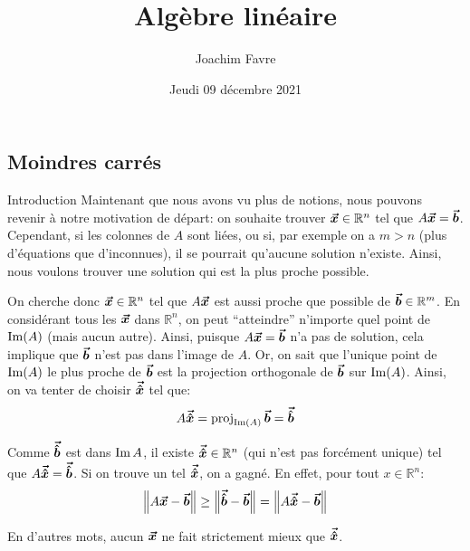 \documentclass[a4paper]{article}
\title{Algèbre linéaire}
\author{Joachim Favre}
\date{Jeudi 09 décembre 2021}
\begin{document}
\maketitle


\subsection{Moindres carrés}
\begin{parag}{Introduction}
    Maintenant que nous avons vu plus de notions, nous pouvons revenir à notre motivation de départ: on souhaite trouver $\bm{\protect\vec{x}} \in \mathbb{R}^n$ tel que $A \bm{\protect\vec{x}} = \bm{\protect\vec{b}}$. Cependant, si les colonnes de $A$ sont liées, ou si, par exemple on a $m > n$ (plus d'équations que d'inconnues), il se pourrait qu'aucune solution n'existe. Ainsi, nous voulons trouver une solution qui est la plus proche possible.

    On cherche donc $\bm{\protect\vec{x}} \in \mathbb{R}^n$ tel que $A \bm{\protect\vec{x}}$ est aussi proche que possible de $\bm{\protect\vec{b}} \in \mathbb{R}^m$. En considérant tous les $\bm{\protect\vec{x}}$ dans $\mathbb{R}^n$, on peut ``atteindre'' n'importe quel point de $\im\left(A\right)$ (mais aucun autre). Ainsi, puisque $A \bm{\protect\vec{x}} = \bm{\protect\vec{b}}$ n'a pas de solution, cela implique que $\bm{\protect\vec{b}}$ n'est pas dans l'image de $A$. Or, on sait que l'unique point de $\im\left(A\right)$ le plus proche de $\bm{\protect\vec{b}}$ est la projection orthogonale de $\bm{\protect\vec{b}}$ sur $\im\left(A\right)$. Ainsi, on va tenter de choisir $\bm{\protect\vec{\hat{x}}}$ tel que:
    \[A \bvec{\hat{x}} = \proj_{\im\left(A\right)} \bvec{b} = \bvec{\hat{b}}\]

    Comme $\bm{\protect\vec{\hat{b}}}$ est dans $\operatorname{Im} A$, il existe $\bm{\protect\vec{\hat{x}}} \in \mathbb{R}^n$ (qui n'est pas forcément unique) tel que $A \bm{\protect\vec{\hat{x}}} = \bm{\protect\vec{\hat{b}}}$. Si on trouve un tel $\bm{\protect\vec{\hat{x}}}$, on a gagné. En effet, pour tout $x \in \mathbb{R}^n$:
    \[\left\|A \bvec{x} - \bvec{b}\right\| \geq \left\|\bvec{\hat{b}} - \bvec{b}\right\| = \left\|A \bvec{\hat{x}} - \bvec{b}\right\|\]

    En d'autres mots, aucun $\bm{\protect\vec{x}}$ ne fait strictement mieux que $\bm{\protect\vec{\hat{x}}}$.
\end{parag}
\end{document}
